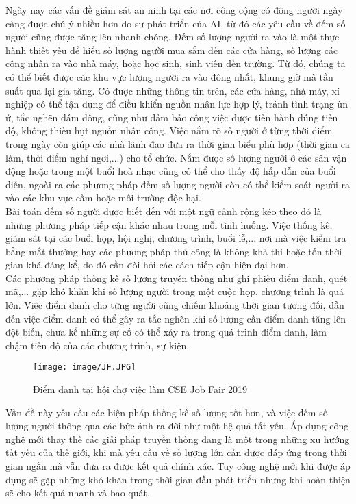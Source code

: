 \documentclass[12pt,a4paper]{article}
\begin{document}
Ngày nay các vấn đề giám sát an ninh tại các nơi công cộng có đông người  ngày càng được chú ý nhiều hơn do sư phát triển của AI, từ đó các yêu cầu về đếm số người cũng được tăng lên nhanh chóng. Đếm số lượng người ra vào là một thực hành thiết yếu để hiểu số lượng người mua sắm đến các cửa hàng, số lượng các công nhân ra vào nhà máy, hoặc học sinh, sinh viên đến trường. Từ đó,  chúng ta có thể biết được các khu vực lượng người ra vào đông nhất, khung giờ mà tần suất qua lại gia tăng. Có được những thông tin trên, các cửa hàng, nhà máy, xí nghiệp có thể tận dụng để điều khiển nguồn nhân lực hợp lý, tránh tình trạng ùn ứ, tắc nghẽn đám đông, cũng như đảm bảo công việc được tiến hành đúng tiến độ, không thiếu hụt nguồn nhân công. Việc nắm rõ số người ở từng thời điểm trong ngày còn giúp các nhà lãnh đạo đưa ra thời gian biểu phù hợp (thời gian ca làm, thời điểm nghỉ ngơi,...) cho tổ chức. Nắm được số lượng người ở các sân vận động hoặc trong một buổi hoà nhạc cũng có thể cho thấy độ hấp dẫn của buổi diễn, ngoài ra các phương pháp đếm số lượng người còn có thể kiểm soát người ra vào các khu vực cấm hoặc môi trường độc hại.\\

Bài toán đếm số người được biết đến với một ngữ cảnh rộng kéo theo đó là những phương pháp tiếp cận khác nhau trong mỗi tình huống. Việc thống kê, giám sát tại các buổi họp, hội nghị, chương trình, buổi lễ,... nơi mà việc kiểm tra bằng mắt thường hay các phương pháp thủ công là không khả thi hoặc tốn thời gian khá đáng kể, do đó cần đòi hỏi các cách tiếp cận hiện đại hơn. \\

Các phương pháp thống kê số lượng truyền thống như ghi phiếu điểm danh, quét mã,... gặp khó khăn khi số lượng người trong một cuộc họp, chương trình là quá lớn. Việc điểm danh cho từng người cũng chiếm khoảng thời gian tương đối, dẫn đến việc điểm danh có thể gây ra tắc nghẽn khi số lượng cần điểm danh tăng lên đột biến, chưa kể những sự cố có thể xảy ra trong quá trình điểm danh, làm chậm tiến độ của các chương trình, sự kiện.

    \begin{figure}[H]
        \centering
        \texttt{[image: image/JF.JPG]}
        \caption{Điểm danh tại hội chợ việc làm CSE Job Fair 2019 \cite{BTT}}
        \label{fig:my_label}
    \end{figure}

Vấn đề này yêu cầu các biện pháp thống kê số lượng tốt hơn, và việc đếm số lượng người thông qua các bức ảnh ra đời như một hệ quả tất yếu. Áp dụng công nghệ mới thay thế các giải pháp truyền thống đang là một trong những xu hướng tất yếu của thế giới, khi mà yêu cầu về số lượng lớn cần được đáp ứng trong thời gian ngắn mà vẫn đưa ra được kết quả chính xác. Tuy công nghệ mới khi được áp dụng sẽ gặp những khó khăn trong thời gian đầu phát triển nhưng khi hoàn thiện sẽ cho kết quả nhanh và bao quát. \\ \\
\end{document}
